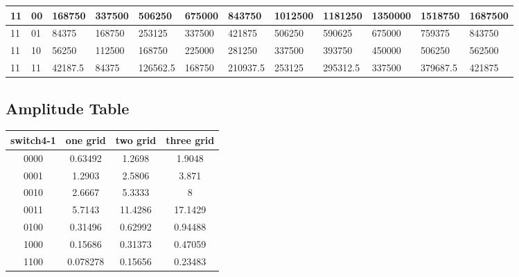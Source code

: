 \documentclass[11pt]{scrartcl}
\begin{document}
\begin{minipage}{.5\linewidth}
\begin{tabular}{p{0.3cm}|p{0.3cm}| p{1.2cm}|p{1.2cm}|p{1.2cm}|p{1.2cm}|p{1.2cm}|p{1.2cm}|p{1.2cm}|p{1.2cm}|p{1.2cm}|p{1.2cm}}
11&00&168750&337500&506250&675000&843750&1012500&1181250&1350000&1518750&1687500\\ \hline




11&01&84375&168750&253125&337500&421875&506250&590625&675000&759375&843750\\ \hline




11&10&56250&112500&168750&225000&281250&337500&393750&450000&506250&562500\\ \hline


11&11&42187.5&84375&126562.5&168750&210937.5&253125&295312.5&337500&379687.5&421875\\ 
\end{tabular}
\end{minipage}

\subsection{Amplitude Table}
\label{sec:amp}
\begin{center}
\begin{tabular}{cccc}
switch4-1& one grid & two grid & three grid\\ \hline 
0000&0.63492&1.2698&1.9048\\ \hline




0001&1.2903&2.5806&3.871\\ \hline




0010&2.6667&5.3333&8\\ \hline




0011&5.7143&11.4286&17.1429\\ \hline




0100&0.31496&0.62992&0.94488\\ \hline




1000&0.15686&0.31373&0.47059\\ \hline




1100&0.078278&0.15656&0.23483\\ \hline
\end{tabular}
\end{center}
\end{document}
